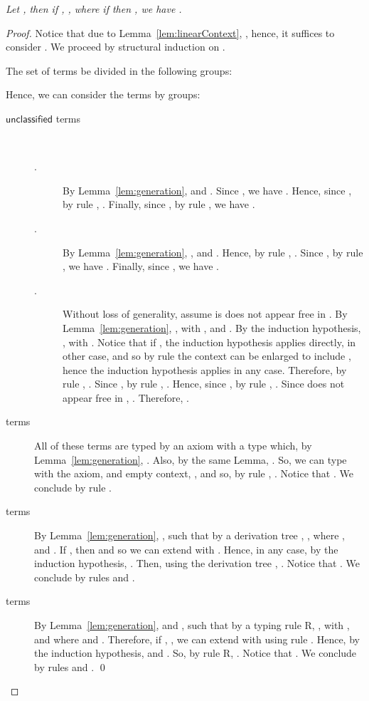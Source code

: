 \documentclass[preprint]{elsarticle}
\newcommand\xrecap[4]{\noindent {\bf #1 \ref{#3} (#2).} \emph{#4}}
\newcommand\s[1]{\ensuremath{\mathsf{#1}}}
\begin{document}
\xrecap{Lemma}{Substitution lemma}{lem:substitution}{
  Let , then if , ,
  where if  then , we have .
}
\begin{proof}
  Notice that due to Lemma~\ref{lem:linearContext}, ,
  hence, it suffices to consider . We proceed by structural
  induction on .

  The set of terms be divided in the following groups:
  
  Hence, we can consider the terms by groups:
  \begin{description}
  \item[\s{unclassified} terms] ~
    \begin{description}
    \item[.] By Lemma~\ref{lem:generation}, 
       and . Since , we have
      . Hence, since , by rule ,
      . Finally, since , by rule ,
      we have .
    \item[.] By Lemma~\ref{lem:generation}, ,
       and . Hence, by rule , . Since
      , by rule , we have .
      Finally, since , we have .
    \item[.] Without loss of generality, assume  is
      does not appear free in . By Lemma~\ref{lem:generation},
      , with ,
       and
      . By the induction
      hypothesis, , with
      . Notice that if ,
      the induction hypothesis applies directly, in other case, 
      and so by rule  the context can be enlarged to include , hence
      the induction hypothesis applies in any case. Therefore, by rule
      , . Since , by rule ,
      . Hence, since
      , by rule ,
      . Since  does not appear free in
      , . Therefore,
      .
    \end{description}
  \item[ terms] All of these terms are typed by an axiom with a
    type  which, by Lemma~\ref{lem:generation}, . Also, by the
    same Lemma, . So, we can type with the axiom,
    and empty context, , and so, by rule ,
    . Notice that . We
    conclude by rule .
  \item[ terms] By Lemma~\ref{lem:generation}, , such that by a derivation tree , ,
    where ,
     and . If
    , then  and so we can extend  with
    . Hence, in any case, by the induction hypothesis,
    . Then, using the derivation tree
    , . Notice that
    . We conclude by rules  and
    .

  \item[ terms] By Lemma~\ref{lem:generation},
     and , such that by a typing rule R,
    , with , and where
     and
    .
    Therefore, if , , we can extend  with
     using rule . Hence, by the induction hypothesis,
     and
    . So, by rule R,
    . Notice that
    . We conclude by rules
     and .
    \qed
  \end{description}
\end{proof}
\end{document}
